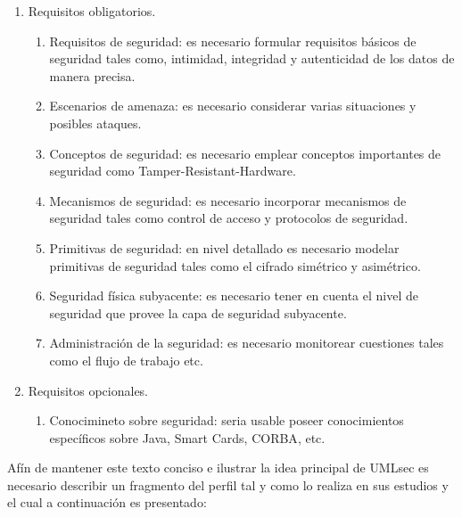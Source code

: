 \documentclass[runningheads,a4paper]{llncs}
\begin{document}
\begin{enumerate}
	\item Requisitos obligatorios.\\
		\begin{enumerate}
			\item Requisitos de seguridad: es necesario formular requisitos básicos de seguridad tales como, intimidad, integridad y autenticidad de los datos de manera precisa.\\
			\item Escenarios de amenaza: es necesario considerar varias situaciones y posibles ataques.\\
			\item Conceptos de seguridad: es necesario emplear conceptos importantes de seguridad como \gls{Tamper-Resistant-Hardware}.\\
			\item Mecanismos de seguridad: es necesario incorporar mecanismos de seguridad tales como control de acceso y protocolos de seguridad.\\
			\item Primitivas de seguridad: en nivel detallado es necesario modelar primitivas de seguridad tales como el cifrado simétrico y asimétrico. \\
			\item Seguridad física subyacente: es necesario tener en cuenta el nivel de seguridad que provee la capa de seguridad subyacente.\\
			\item Administración de la seguridad: es necesario monitorear cuestiones tales como el flujo de trabajo etc.\\ 
		\end{enumerate}
		
	\item Requisitos opcionales.\\
		\begin{enumerate}
			\item Conocimineto sobre seguridad: seria usable poseer conocimientos específicos sobre Java, \gls{Smart Cards}, \gls{CORBA}, etc.
		\end{enumerate}			
	
\end{enumerate}

Afín de mantener este texto conciso e ilustrar la idea principal de \gls{UMLsec} es necesario describir un fragmento del perfil tal y como lo realiza \cite{UMLsecExtending} en sus estudios y el cual a continuación es presentado:
\end{document}
